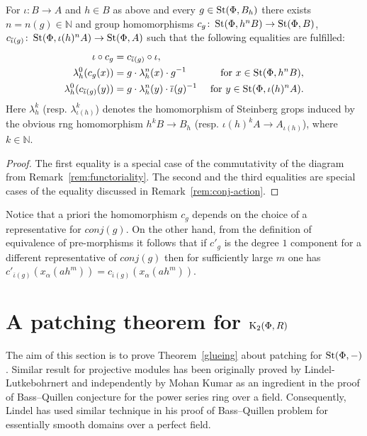 \documentclass[oneside, 11pt]{amsart} \pdfoutput=1
\begin{document}
\begin{corollary}
\label{vorcor}
For $\iota \colon B \to A$ and $h \in B$ as above and every $g \in \mathop{\mathrm{St}}\nolimits(\Phi, B_h)$ there exists $n = n(g) \in \mathbb{N}$ 
and group homomorphisms $c_g \colon \mathop{\mathrm{St}}\nolimits(\Phi, h^nB) \to \mathop{\mathrm{St}}\nolimits(\Phi, B)$, $c_{\overline{\iota}(g)} \colon \mathop{\mathrm{St}}\nolimits(\Phi, \iota(h)^nA) \to \mathop{\mathrm{St}}\nolimits(\Phi, A)$
such that the following equalities are fulfilled:
\begin{align}
 \label{eq:coherence} \iota \circ c_g &= c_{\overline{\iota}(g)} \circ \iota, &\\
 \label{eq:strictB} \lambda_h^0 (c_g (x)) &= g \cdot \lambda_h^n(x) \cdot g^{-1}&\text{ for }x \in \mathop{\mathrm{St}}\nolimits(\Phi, h^nB),\\
 \label{eq:strictA} \lambda_h^0 (c_{\overline{\iota}(g)}(y)) &= g \cdot \lambda_h^n(y) \cdot \overline{\iota}(g)^{-1}&\text{ for }y \in \mathop{\mathrm{St}}\nolimits(\Phi, \iota(h)^nA).
\end{align}
Here $\lambda_h^k$ (resp. $\lambda^k_{\iota(h)}$) denotes the homomorphism of Steinberg grops induced by the obvious rng homomorphism $h^kB \to B_h$ (resp. $\iota(h)^kA \to A_{\iota(h)}$), where $k \in \mathbb{N}$.
\end{corollary}
\begin{proof}
 The first equality is a special case of the commutativity of the diagram from Remark~\ref{rem:functoriality}.
 The second and the third equalities are special cases of the equality discussed in Remark~\ref{rem:conj-action}.
\end{proof}
\begin{rem}\label{rem:indendepence}
 Notice that a priori the homomorphism $c_g$ depends on the choice of a representative for $conj(g)$. On the other hand, from the definition of equivalence of pre-morphisms it follows that if $c'_g$ is the degree $1$ component for a different representative of $conj(g)$ then for sufficiently large $m$ one has $c'_{\overline{\iota}(g)}(x_{\alpha}(ah^m)) = c_{\overline{\iota}(g)}(x_{\alpha}(ah^m))$.
\end{rem}


\section{A patching theorem for \texorpdfstring{${\mathrm{K}}_2(\Phi, R)$}{K2(Ф,R)}} \label{sec:patching}
The aim of this section is to prove Theorem~\ref{glueing} about patching for $\mathop{\mathrm{St}}\nolimits(\Phi,-)$. 
Similar result for projective modules has been originally proved by Lindel-Lutkebohrnert and independently by Mohan Kumar as an ingredient in the proof of Bass--Quillen conjecture for the power series ring over a field. 
Consequently, Lindel has used similar technique in his proof of Bass--Quillen problem for essentially smooth domains over a perfect field.
\end{document}
